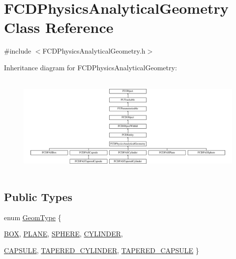 \hypertarget{classFCDPhysicsAnalyticalGeometry}{
\section{FCDPhysicsAnalyticalGeometry Class Reference}
\label{classFCDPhysicsAnalyticalGeometry}
}


{\ttfamily \#include $<$FCDPhysicsAnalyticalGeometry.h$>$}

Inheritance diagram for FCDPhysicsAnalyticalGeometry:\begin{figure}[H]
\begin{center}
\leavevmode
\includegraphics[height=5.040000cm]{classFCDPhysicsAnalyticalGeometry}
\end{center}
\end{figure}
\subsection*{Public Types}
\begin{DoxyCompactItemize}
\item 
enum \hyperlink{classFCDPhysicsAnalyticalGeometry_a511583406e5c6a1bb5bd84c0453a452c}{GeomType} \{ \par
\hyperlink{classFCDPhysicsAnalyticalGeometry_a511583406e5c6a1bb5bd84c0453a452cae83cea13f5c459f83e3b83f26f7bedaa}{BOX}, 
\hyperlink{classFCDPhysicsAnalyticalGeometry_a511583406e5c6a1bb5bd84c0453a452caefa79f8ac87976e3a75852cacc69d246}{PLANE}, 
\hyperlink{classFCDPhysicsAnalyticalGeometry_a511583406e5c6a1bb5bd84c0453a452ca1050722190aec6e9bf2f8cb13d735858}{SPHERE}, 
\hyperlink{classFCDPhysicsAnalyticalGeometry_a511583406e5c6a1bb5bd84c0453a452ca28c79b4c17d2c0c61ecbcdf686693053}{CYLINDER}, 
\par
\hyperlink{classFCDPhysicsAnalyticalGeometry_a511583406e5c6a1bb5bd84c0453a452ca382514ba832f62edf207f62eac996442}{CAPSULE}, 
\hyperlink{classFCDPhysicsAnalyticalGeometry_a511583406e5c6a1bb5bd84c0453a452ca873fd6d465a43ec7169a40d2cad11ba7}{TAPERED\_\-CYLINDER}, 
\hyperlink{classFCDPhysicsAnalyticalGeometry_a511583406e5c6a1bb5bd84c0453a452ca09a4f0d219d85483f8ec1d0319f1a179}{TAPERED\_\-CAPSULE}
 \}
\end{DoxyCompactItemize}
